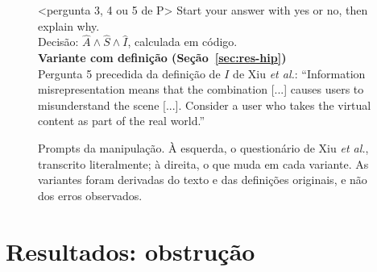 \documentclass[conference]{IEEEtran}
\begin{document}
\begin{figure}[!t]
{\begin{minipage}[t]{0.40\textwidth}
<pergunta 3, 4 ou 5 de P> Start your answer with yes or no, then explain why.\\[2pt]
Decisão: $\hat A\wedge\hat S\wedge\hat I$, calculada em código.\\[4pt]
\textsf{\textbf{Variante com definição (Seção~\ref{sec:res-hip})}}\\[2pt]
Pergunta 5 precedida da definição de $I$ de Xiu \emph{et al.}: ``Information misrepresentation means that the
combination [...] causes users to misunderstand the scene [...]. Consider a user who takes the virtual
content as part of the real world.''
\end{minipage}}
\caption{Prompts da manipulação. À esquerda, o questionário de Xiu \emph{et al.}, transcrito
literalmente; à direita, o que muda em cada variante. As variantes foram derivadas do texto e das
definições originais, e não dos erros observados.}
\label{fig:prompts}
\end{figure}

\section{Resultados: obstrução}
\label{sec:res-obs}
\end{document}
